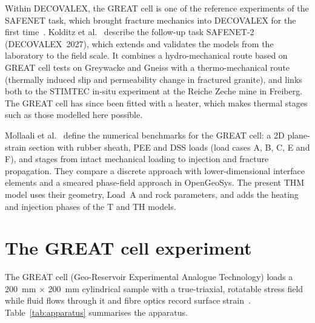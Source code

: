 \documentclass[11pt,a4paper]{article}
\begin{document}
Within DECOVALEX, the GREAT cell is one of the reference experiments of the
SAFENET task, which brought fracture mechanics into DECOVALEX for the first
time~\cite{UFZDecovalex2023}. Kolditz et al.~\cite{Kolditz2025} describe the
follow-up task SAFENET-2 (DECOVALEX~2027), which extends and validates the
models from the laboratory to the field scale. It combines a hydro-mechanical
route based on GREAT cell tests on Greywacke and Gneiss with a
thermo-mechanical route (thermally induced slip and permeability change in
fractured granite), and links both to the STIMTEC in-situ experiment at the
Reiche Zeche mine in Freiberg. The GREAT cell has since been fitted with a
heater, which makes thermal stages such as those modelled here possible.

Mollaali et al.~\cite{Mollaali2026} define the numerical benchmarks for the
GREAT cell: a 2D plane-strain section with rubber sheath, PEE and DSS loads
(load cases A, B, C, E and F), and stages from intact mechanical loading to injection and
fracture propagation. They compare a discrete approach with lower-dimensional
interface elements and a smeared phase-field approach in OpenGeoSys. The
present THM model uses their geometry, Load~A and rock parameters, and adds
the heating and injection phases of the T and TH models.

\section{The GREAT cell experiment}
The GREAT cell (Geo-Reservoir Experimental Analogue Technology) loads a
\SI{200}{mm} $\times$ \SI{200}{mm} cylindrical sample with a true-triaxial,
rotatable stress field while fluid flows through it and fibre optics record
surface strain~\cite{McDermott2018,EdinburghGREAT}. Table~\ref{tab:apparatus}
summarises the apparatus.
\end{document}
